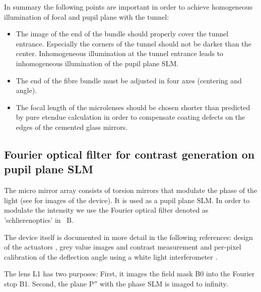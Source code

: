 In summary the following points are important in order to achieve
homogeneous illumination of focal and pupil plane with the tunnel:
\begin{itemize}
\item The image of the end of the bundle should properly cover the
  tunnel entrance. Especially the corners of the tunnel should not be
  darker than the center. Inhomogeneous illumination at the tunnel
  entrance leads to inhomogeneous illumination of the pupil plane SLM.
\item The end of the fibre bundle must be adjusted in four axes
  (centering and angle).
\item The focal length of the microlenses should be chosen shorter
  than predicted by pure etendue calculation in order to compensate
  coating defects on the edges of the cemented glass mirrors.
\end{itemize}

\subsection{Fourier optical filter for contrast generation on pupil
  plane SLM}
\label{sec:mma}
The micro mirror array consists of
torsion mirrors that modulate the phase of the light (see
 for images of the device). It is used as a pupil plane SLM.
In order to modulate the
intensity we use the Fourier optical filter denoted as
'schlierenoptics' in ~B.

The device itself is documented in more detail in the following
references: design of the actuators \citep{Schmidt2010}, grey value
images and contrast measurement \citep{Berndt2010} and per-pixel
calibration of the deflection angle using a white light interferometer
\citep{Berndt2011,Berndt2007}.


The lens L1 has two purposes: First, it images the field mask B0 into 
the Fourier stop B1. Second, the plane $\textrm{P}''$ with the phase
SLM is imaged to infinity.

